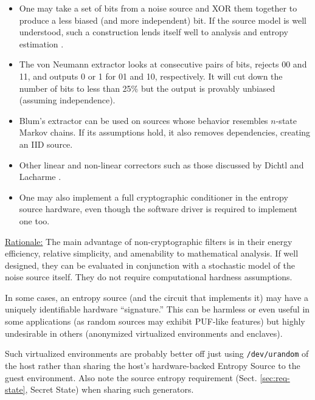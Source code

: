     \begin{itemize}
    \item   One may take a set of bits from a noise source and XOR them
            together to produce a less biased (and more independent) bit.
            If the source model is well understood, such a construction
            lends itself well to analysis and entropy estimation \cite{Da02}.
    \item   The von Neumann extractor \cite{Ne51} looks at consecutive
            pairs of bits, rejects 00 and 11, and outputs 0 or 1 for
            01 and 10, respectively. It will cut down the number of bits to
            less than 25\% but the output is provably unbiased (assuming
            independence).
    \item   Blum's extractor \cite{Bl86} can be used on sources
            whose behavior resembles $n$-state Markov chains. If its
            assumptions hold, it also removes dependencies, creating an IID
            source.
    \item   Other linear and non-linear correctors such as those
            discussed by Dichtl and Lacharme \cite{La08}.
    \item   One may also implement a full cryptographic conditioner
            in the entropy source hardware, even though the software driver
            is required to implement one too.
    \end{itemize}

    \underline{Rationale:}
    The main advantage of non-cryptographic filters is in their
    energy efficiency, relative simplicity, and amenability to mathematical
    analysis. If well designed, they can be evaluated in
    conjunction with a stochastic model of the noise source itself.
    They do not require computational hardness assumptions.

    In some cases, an entropy source (and the circuit that implements it)
    may have a uniquely identifiable hardware ``signature.'' This can be
    harmless or even useful in some applications (as random sources may
    exhibit PUF-like features) but highly undesirable in others (anonymized
    virtualized environments and enclaves).

    Such virtualized environments are probably better off just using
    \verb|/dev/urandom| of the host rather than sharing the host's
    hardware-backed Entropy Source to the guest environment. Also note the
    source entropy requirement (Sect. \ref{sec:req-state}, Secret State)
    when sharing such generators.

